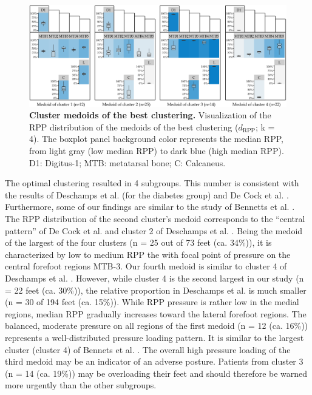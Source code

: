 \documentclass[
  oneside]{book}
\begin{document}
\begin{figure}[htb]

{\centering \includegraphics[width=1\linewidth]{figures/07-cbms-clusters} 

}

\caption{\textbf{Cluster medoids of the best clustering.} Visualization of the RPP distribution of the medoids of the best clustering (\(d_{\text{RPP}}\); k = 4). The boxplot panel background color represents the median RPP, from light gray (low median RPP) to dark blue (high median RPP). D1: Digitus-1; MTB: metatarsal bone; C: Calcaneus.}\label{fig:07-cbms-clusters}
\end{figure}

The optimal clustering resulted in 4 subgroups.
This number is consistent with the results of Deschamps et al. \autocite{DeschampsEtAL:KMeansDiabeticFoot2013} (for the diabetes group) and De Cock et al. \autocite{DeCockEtAl:FootTypeClusteringPlantarPressure2006}.
Furthermore, some of our findings are similar to the study of Bennetts et al. \autocite{BennettsEtAl:Biomechanics2013}.
The RPP distribution of the second cluster's medoid corresponds to the ``central pattern'' of De Cock et al. \autocite{DeCockEtAl:FootTypeClusteringPlantarPressure2006} and cluster 2 of Deschamps et al. \autocite{DeschampsEtAL:KMeansDiabeticFoot2013}.
Being the medoid of the largest of the four clusters (n = 25 out of 73 feet (ca. 34\%)), it is characterized by low to medium RPP the with focal point of pressure on the central forefoot regions MTB-3.
Our fourth medoid is similar to cluster 4 of Deschamps et al. \autocite{DeschampsEtAL:KMeansDiabeticFoot2013}.
However, while cluster 4 is the second largest in our study (n = 22 feet (ca. 30\%)), the relative proportion in Deschamps et al. \autocite{DeschampsEtAL:KMeansDiabeticFoot2013} is much smaller (n = 30 of 194 feet (ca. 15\%)).
While RPP pressure is rather low in the medial regions, median RPP gradually increases toward the lateral forefoot regions.
The balanced, moderate pressure on all regions of the first medoid (n = 12 (ca. 16\%)) represents a well-distributed pressure loading pattern.
It is similar to the largest cluster (cluster 4) of Bennets et al. \autocite{BennettsEtAl:Biomechanics2013}.
The overall high pressure loading of the third medoid may be an indicator of an adverse posture.
Patients from cluster 3 (n = 14 (ca. 19\%)) may be overloading their feet and should therefore be warned more urgently than the other subgroups.
\end{document}
